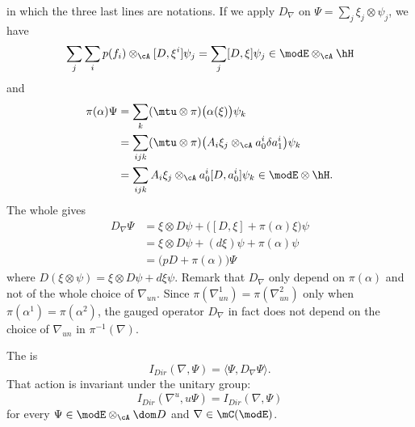 in which the three last lines are notations. If we apply $D_{\nabla}$ on $\Psi=\sum_j\xi_j\otimes\psi_j$, we have
\[
	\sum_j\sum_ip(f_i)\otimes_{\cA}[D,\xi^i]\psi_j=\sum_j[D,\xi]\psi_j\in\modE\otimes_{\cA}\hH
\]
and
\begin{align*}
	\pi(\alpha)\Psi & =\sum_k(\mtu\otimes\pi)\big( \alpha(\xi) \big)\psi_k                                \\
	                & =\sum_{ijk}(\mtu\otimes\pi)\big( A_i\xi_j\otimes_{\cA}a^i_0\delta a^i_1 \big)\psi_k \\
	                & =\sum_{ijk}A_i\xi_j\otimes_{\cA}a^i_0[D,a^i_0]\psi_k\in\modE\otimes\hH.
\end{align*}
The whole gives
\[
	\begin{split}
		D_{\nabla}\Psi&=\xi\otimes D\psi+\big( [D,\xi]+\pi(\alpha)\xi \big)\psi\\
		&=\xi\otimes D\psi+(d\xi)\psi+\pi(\alpha)\psi\\
		&=\big( pD+\pi(\alpha) \big)\Psi
	\end{split}
\]
where $D(\xi\otimes\psi)=\xi\otimes D\psi+d\xi\psi$. Remark that $D_{\nabla}$ only depend on $\pi(\alpha)$ and not of the whole choice of $\nabla_{un}$. Since $\pi(\nabla^1_{un})=\pi(\nabla^2_{un})$ only when $\pi(\alpha^1)=\pi(\alpha^2)$, the gauged operator $D_{\nabla}$ in fact does not depend on the choice of $\nabla_{un}$ in $\pi^{-1}(\nabla)$.

\begin{proposition}
	The  is
	\begin{equation}
		I_{Dir}(\nabla,\Psi)=\langle \Psi, D_{\nabla}\Psi\rangle.
	\end{equation}
	That action is invariant under the unitary group:
	\[
		I_{Dir}(\nabla^u,u\Psi)=I_{Dir}(\nabla,\Psi)
	\]
	for every $\Psi\in\modE\otimes_{\cA}\dom D$ and $\nabla\in \mC(\modE)$.
\end{proposition}

